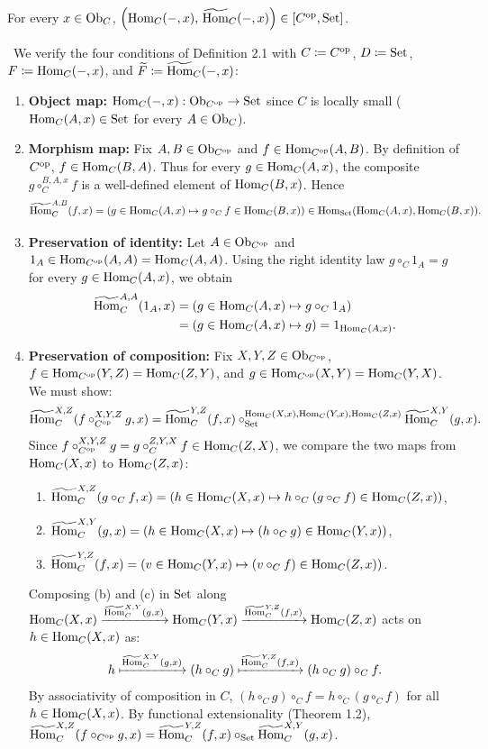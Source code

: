 \documentclass[10pt,a4paper]{article}
\begin{document}
\begin{lemma}
For every $x \in {\textrm{Ob}}_C$, $\left({\textrm{Hom}}_C(-, x),\, {\widetilde{{\textrm{Hom}}}\textrm{}}_C(-,x)\right) \in [C^{\textrm{op}},{\textrm{Set}}]$.
\end{lemma}
\myprf\ We verify the four conditions of Definition 2.1 with $C \coloneqq C^{\textrm{op}}$, $D \coloneqq {\textrm{Set}}$, $F \coloneqq {\textrm{Hom}}_C(-,x)$, and ${\widetilde{F}\textrm{}} \coloneqq {\widetilde{{\textrm{Hom}}}\textrm{}}_C(-,x)$:
\begin{enumerate}
\item \textbf{Object map:} ${\textrm{Hom}}_C(-, x) : {\textrm{Ob}}_{C^{\textrm{op}}} \to {\textrm{Set}}$ since $C$ is locally small (${\textrm{Hom}}_C(A,x) \in {\textrm{Set}}$ for every $A \in {\textrm{Ob}}_C$).
\item \textbf{Morphism map:} Fix $A,B \in {\textrm{Ob}}_{C^{\textrm{op}}}$ and $f \in {\textrm{Hom}}_{C^{\textrm{op}}}(A,B)$. By definition of $C^{\textrm{op}}$, $f \in {\textrm{Hom}}_C(B,A)$. Thus for every $g \in {\textrm{Hom}}_C(A,x)$, the composite $g \circ_C^{B,A,x} f$ is a well-defined element of ${\textrm{Hom}}_C(B,x)$. Hence
$${\widetilde{{\textrm{Hom}}}\textrm{}}_C^{A,B}(f, x) = \left(g \in {\textrm{Hom}}_C(A,x) \mapsto g \circ_C f \in {\textrm{Hom}}_C(B,x)\right) \in {\textrm{Hom}}_{\textrm{Set}}({\textrm{Hom}}_C(A,x), {\textrm{Hom}}_C(B,x)).$$
\item \textbf{Preservation of identity:} Let $A \in {\textrm{Ob}}_{C^{\textrm{op}}}$ and $1_A \in {\textrm{Hom}}_{C^{\textrm{op}}}(A,A) = {\textrm{Hom}}_C(A,A)$. Using the right identity law $g \circ_C 1_A = g$ for every $g \in {\textrm{Hom}}_C(A,x)$, we obtain
\begin{align*}
{\widetilde{{\textrm{Hom}}}\textrm{}}_C^{A,A}(1_A, x) &= \left(g \in {\textrm{Hom}}_C(A,x) \mapsto g \circ_C 1_A\right) \\
&= \left(g \in {\textrm{Hom}}_C(A,x) \mapsto g\right) = 1_{{\textrm{Hom}}_C(A,x)}.
\end{align*}
\item \textbf{Preservation of composition:} Fix $X,Y,Z \in {\textrm{Ob}}_{C^{\textrm{op}}}$, $f \in {\textrm{Hom}}_{C^{\textrm{op}}}(Y,Z) = {\textrm{Hom}}_C(Z,Y)$, and $g \in {\textrm{Hom}}_{C^{\textrm{op}}}(X,Y) = {\textrm{Hom}}_C(Y,X)$. We must show:
$${\widetilde{{\textrm{Hom}}}\textrm{}}_C^{X,Z}(f \circ_{C^{\textrm{op}}}^{X,Y,Z} g, x) = {\widetilde{{\textrm{Hom}}}\textrm{}}_C^{Y,Z}(f,x) \circ_{\textrm{Set}}^{{\textrm{Hom}}_C(X,x),{\textrm{Hom}}_C(Y,x),{\textrm{Hom}}_C(Z,x)} {\widetilde{{\textrm{Hom}}}\textrm{}}_C^{X,Y}(g,x).$$
Since $f \circ_{C^{\textrm{op}}}^{X,Y,Z} g = g \circ_C^{Z,Y,X} f \in {\textrm{Hom}}_C(Z,X)$, we compare the two maps from ${\textrm{Hom}}_C(X,x)$ to ${\textrm{Hom}}_C(Z,x)$:
\begin{enumerate}
\item[(a)] ${\widetilde{{\textrm{Hom}}}\textrm{}}_C^{X,Z}(g \circ_C f, x) = \left(h \in {\textrm{Hom}}_C(X,x) \mapsto h \circ_C (g \circ_C f) \in {\textrm{Hom}}_C(Z,x)\right)$,
\item[(b)] ${\widetilde{{\textrm{Hom}}}\textrm{}}_C^{X,Y}(g, x) = \left(h \in {\textrm{Hom}}_C(X,x) \mapsto (h \circ_C g) \in {\textrm{Hom}}_C(Y,x)\right)$,
\item[(c)] ${\widetilde{{\textrm{Hom}}}\textrm{}}_C^{Y,Z}(f, x) = \left(v \in {\textrm{Hom}}_C(Y,x) \mapsto (v \circ_C f) \in {\textrm{Hom}}_C(Z,x)\right)$.
\end{enumerate}
Composing (b) and (c) in ${\textrm{Set}}$ along ${\textrm{Hom}}_C(X,x) \xrightarrow{{\widetilde{{\textrm{Hom}}}\textrm{}}_C^{X,Y}(g, x)} {\textrm{Hom}}_C(Y,x) \xrightarrow{{\widetilde{{\textrm{Hom}}}\textrm{}}_C^{Y,Z}(f, x)} {\textrm{Hom}}_C(Z,x)$ acts on $h \in {\textrm{Hom}}_C(X,x)$ as:
$$h \xmapsto{{\widetilde{{\textrm{Hom}}}\textrm{}}_C^{X,Y}(g, x)} (h \circ_C g) \xmapsto{{\widetilde{{\textrm{Hom}}}\textrm{}}_C^{Y,Z}(f, x)} (h \circ_C g) \circ_C f.$$
By associativity of composition in $C$, $(h \circ_C g) \circ_C f = h \circ_C (g \circ_C f)$ for all $h \in {\textrm{Hom}}_C(X,x)$. By functional extensionality (Theorem 1.2), ${\widetilde{{\textrm{Hom}}}\textrm{}}_C^{X,Z}(f \circ_{C^{\textrm{op}}} g, x) = {\widetilde{{\textrm{Hom}}}\textrm{}}_C^{Y,Z}(f,x) \circ_{\textrm{Set}} {\widetilde{{\textrm{Hom}}}\textrm{}}_C^{X,Y}(g,x)$.
\end{enumerate}
\end{document}
